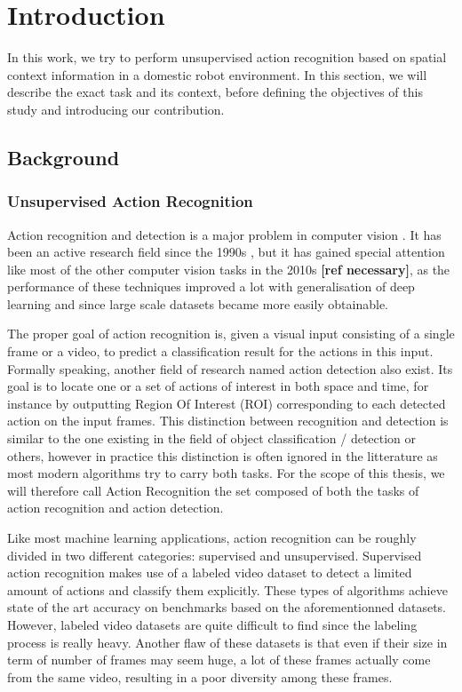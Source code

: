 \chapter{Introduction}

In this work, we try to perform unsupervised action recognition based on spatial context information in a domestic robot environment. In this section, we will describe the exact task and its context, before defining the objectives of this study and introducing our contribution.

\section{Background}
\subsection{Unsupervised Action Recognition}
Action recognition and detection is a major problem in computer vision \cite{review_action_recognition}. It has been an active research field since the 1990s \cite{plan_recognition}, but it has gained special attention like most of the other computer vision tasks in the 2010s \textbf{[ref necessary]}, as the performance of these techniques improved a lot with generalisation of deep learning and since large scale datasets became more easily obtainable.

The proper goal of action recognition is, given a visual input consisting of a single frame or a video, to predict a classification result for the actions in this input. Formally speaking, another field of research named action detection also exist. Its goal is to locate one or a set of actions of interest in both space and time, for instance by outputting Region Of Interest (ROI) corresponding to each detected action on the input frames.
This distinction between recognition and detection is similar to the one existing in the field of object classification / detection or others, however in practice this distinction is often ignored in the litterature as most modern algorithms try to carry both tasks. For the scope of this thesis, we will therefore call Action Recognition the set composed of both the tasks of action recognition and action detection.
\vspace{12pt}

Like most machine learning applications, action recognition can be roughly divided in two different categories: supervised and unsupervised. Supervised action recognition makes use of a labeled video dataset \cite{hollywood2,sports_video_dataset,ActivityNet} to detect a limited amount of actions and classify them explicitly. These types of algorithms achieve state of the art accuracy on benchmarks based on the aforementionned datasets. However, labeled video datasets are quite difficult to find since the labeling process is really heavy. Another flaw of these datasets is that even if their size in term of number of frames may seem huge, a lot of these frames actually come from the same video, resulting in a poor diversity among these frames.

